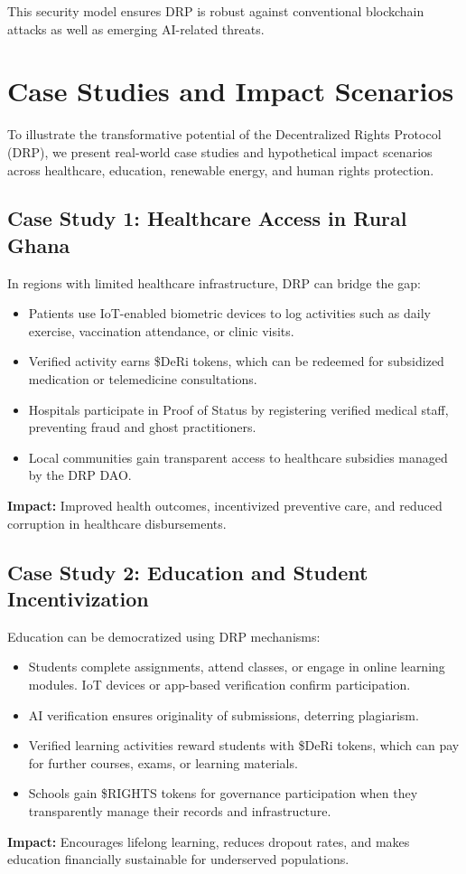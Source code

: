 \documentclass[11pt,a4paper]{article}
\begin{document}
This security model ensures DRP is robust against conventional blockchain attacks as well as emerging AI-related threats.
\section{Case Studies and Impact Scenarios}

To illustrate the transformative potential of the Decentralized Rights Protocol (DRP), we present real-world case studies and hypothetical impact scenarios across healthcare, education, renewable energy, and human rights protection.

\subsection{Case Study 1: Healthcare Access in Rural Ghana}
In regions with limited healthcare infrastructure, DRP can bridge the gap:
\begin{itemize}
    \item Patients use IoT-enabled biometric devices to log activities such as daily exercise, vaccination attendance, or clinic visits.  
    \item Verified activity earns \$DeRi tokens, which can be redeemed for subsidized medication or telemedicine consultations.  
    \item Hospitals participate in Proof of Status by registering verified medical staff, preventing fraud and ghost practitioners.  
    \item Local communities gain transparent access to healthcare subsidies managed by the DRP DAO.  
\end{itemize}
\textbf{Impact:} Improved health outcomes, incentivized preventive care, and reduced corruption in healthcare disbursements.

\subsection{Case Study 2: Education and Student Incentivization}
Education can be democratized using DRP mechanisms:
\begin{itemize}
    \item Students complete assignments, attend classes, or engage in online learning modules. IoT devices or app-based verification confirm participation.  
    \item AI verification ensures originality of submissions, deterring plagiarism.  
    \item Verified learning activities reward students with \$DeRi tokens, which can pay for further courses, exams, or learning materials.  
    \item Schools gain \$RIGHTS tokens for governance participation when they transparently manage their records and infrastructure.  
\end{itemize}
\textbf{Impact:} Encourages lifelong learning, reduces dropout rates, and makes education financially sustainable for underserved populations.
\end{document}
